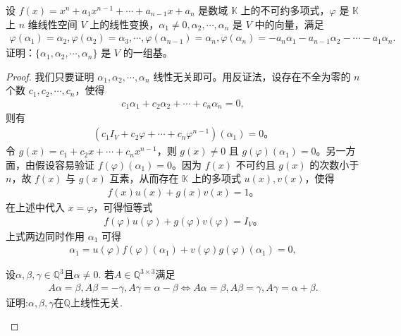 \documentclass[../../main.tex]{subfiles}
\begin{document}
\begin{proposition}\label{proposition:不可约多项式与向量组线性无关}
设 $f(x) = x^n + a_1 x^{n-1} + \cdots + a_{n-1} x + a_n$ 是数域 $\mathbb{K}$ 上的不可约多项式，$\varphi$ 是 $\mathbb{K}$ 上 $n$ 维线性空间 $V$ 上的线性变换，$\alpha_1 \neq 0, \alpha_2, \cdots, \alpha_n$ 是 $V$ 中的向量，满足
\begin{align*}
\varphi (\alpha _1)=\alpha _2,\varphi (\alpha _2)=\alpha _3,\cdots ,\varphi (\alpha _{n-1})=\alpha _n,\varphi (\alpha _n)=-a_n\alpha _1-a_{n-1}\alpha _2-\cdots -a_1\alpha _n.
\end{align*}
证明：$\{\alpha_1, \alpha_2, \cdots, \alpha_n\}$ 是 $V$ 的一组基。
\end{proposition}
\begin{proof}
我们只要证明 $\alpha_1, \alpha_2, \cdots, \alpha_n$ 线性无关即可。用反证法，设存在不全为零的 $n$ 个数 $c_1, c_2, \cdots, c_n$，使得
\begin{align*}
c_1 \alpha_1 + c_2 \alpha_2 + \cdots + c_n \alpha_n = 0,
\end{align*}
则有
\begin{align*}
(c_1 I_V + c_2 \varphi + \cdots + c_n \varphi^{n-1})(\alpha_1) = 0。
\end{align*}
令 $g(x) = c_1 + c_2 x + \cdots + c_n x^{n-1}$，则 $g(x) \neq 0$ 且 $g(\varphi)(\alpha_1) = 0$。另一方面，由假设容易验证 $f(\varphi)(\alpha_1) = 0$。因为 $f(x)$ 不可约且 $g(x)$ 的次数小于 $n$，故 $f(x)$ 与 $g(x)$ 互素，从而存在 $\mathbb{K}$ 上的多项式 $u(x), v(x)$，使得
\begin{align*}
f(x)u(x) + g(x)v(x) = 1。
\end{align*}
在上述中代入 $x = \varphi$，可得恒等式
\begin{align*}
f(\varphi)u(\varphi) + g(\varphi)v(\varphi) = I_V。
\end{align*}
上式两边同时作用 $\alpha_1$ 可得
\begin{align*}
\alpha_1 = u(\varphi)f(\varphi)(\alpha_1) + v(\varphi)g(\varphi)(\alpha_1) = 0,
\end{align*}
\begin{example}\label{example:有理数域上线性变换与向量组线性无关的命题}
设$\alpha, \beta, \gamma \in \mathbb{Q}^3$且$\alpha \neq 0$. 若$A \in \mathbb{Q}^{3 \times 3}$满足
\begin{align*}
A\alpha =\beta ,A\beta =-\gamma ,A\gamma =\alpha -\beta \Longleftrightarrow A\alpha =\beta ,A\beta =\gamma ,A\gamma =\alpha +\beta .
\end{align*}
证明:$\alpha, \beta, \gamma$在$\mathbb{Q}$上线性无关.

\end{example}
\end{proof}
\end{document}
